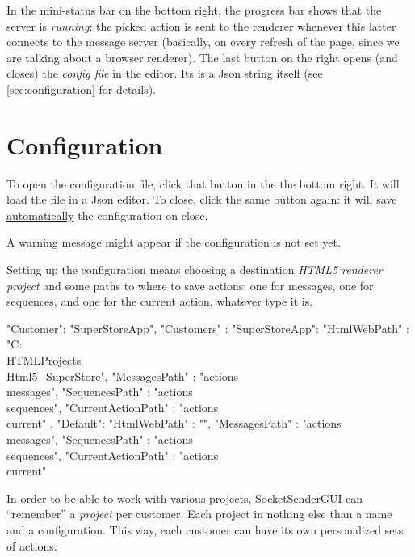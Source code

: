 \documentclass[11pt]{refart}
\newcommand{\marginicon}[2][]{\marginlabel{\raisebox{-.1\height}{\texttt{[image: \#2]}}}}
\newcommand*{\textAtt}[1]{\attention\underline{#1}}
\newcommand*{\socketsender}{SocketSenderGUI\xspace}
\begin{document}
In the mini-status bar on the bottom right, the progress bar shows that the server is \emph{running}: the picked action is sent to the renderer whenever this latter connects to the message server (basically, on every refresh of the page, since we are talking about a browser renderer).
The last button on the right opens (and closes) the \emph{config file} in the editor. 
Its is a Json string itself (see \autoref{sec:configuration} for details).


\section{Configuration}
\label{sec:configuration}

\marginicon[scale=0.5]{../icons/1481130257_Working_Tools_2}
To open the configuration file, click that button in the the bottom right. 
It will load the file in a Json editor. 
To close, click the same button again:
it will \textAtt{save automatically} the configuration on close.

A warning message might appear if the configuration is not set yet.

Setting up the configuration means choosing a destination \emph{HTML5 renderer project} and some paths to where to save actions: one for messages, one for sequences, and one for the current action, whatever type it is.

\begin{screenBox}[colbacktitle=white, coltitle=black, title=The configuration file]
\footnotesize
\begin{verbatimtab}[3]
{
	"Customer": "SuperStoreApp",
	"Customers" : {
		"SuperStoreApp": {
			"HtmlWebPath" : "C:\\HTMLProjects\\Html5_SuperStore",
			"MessagesPath" : "actions\\messages",
			"SequencesPath" : "actions\\sequences",
			"CurrentActionPath" : "actions\\current"
		},
		"Default": {
			"HtmlWebPath" : "",
			"MessagesPath" : "actions\\messages",
			"SequencesPath" : "actions\\sequences",
			"CurrentActionPath" : "actions\\current"
		}
	}
}
\end{verbatimtab}
\end{screenBox}

In order to be able to work with various projects, \socketsender can ``remember'' a \emph{project} per customer.
Each project in nothing else than a name and a configuration.
This way, each customer can have its own personalized sets of actions.
\end{document}
